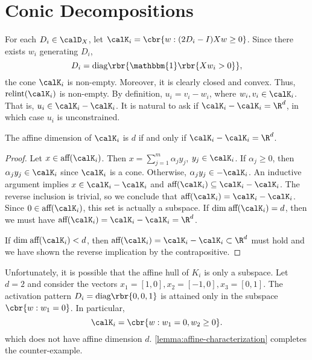 \documentclass{article}
\begin{document}
\section{Conic Decompositions}

For each \( D_i \in \calD_X \), let \( \calK_i = \cbr{w : (2D_i - I) X w \geq 0} \).
Since there exists \( w_i \) generating \( D_i \),
\[
	D_i = \text{diag}\rbr{\mathbbm{1}\rbr{X w_i > 0}},
\]
the cone \( \calK_i \) is non-empty.
Moreover, it is clearly closed and convex.
Thus, \( \text{relint} (\calK_i) \) is non-empty.
By definition, \( u_i = v_i - w_i \), where \( w_i, v_i \in \calK_i \).
That is, \( u_i \in \calK_i - \calK_i \).
It is natural to ask if \( \calK_i - \calK_i = \R^d \), in which case \( u_i \) is unconstrained.

\begin{lemma}\label{lemma:affine-characterization}
	The affine dimension of \( \calK_i \) is \( d \) if and only if \( \calK_i - \calK_i = \R^d \).
\end{lemma}
\begin{proof}
	Let \( x \in \text{aff} (\calK_i) \).
	Then \( x = \sum_{j=1}^m \alpha_j y_j \), \( y_j \in \calK_i \).
	If \( \alpha_j \geq 0 \), then \( \alpha_j y_j \in \calK_i \) since \( \calK_i \) is a cone.
	Otherwise, \( \alpha_j y_j \in - \calK_i \).
	An inductive argument implies \( x \in \calK_i - \calK_i \) and \( \text{aff} (\calK_i) \subseteq \calK_i - \calK_i \).
	The reverse inclusion is trivial, so we conclude that \( \text{aff} (\calK_i) = \calK_i - \calK_i \).
	Since \( 0 \in \text{aff} (\calK_i) \), this set is actually a subspace.
	If \( \text{dim} \; \text{aff} (\calK_i) = d \), then we must have \( \text{aff} (\calK_i) = \calK_i - \calK_i = \R^d \).

	If \( \text{dim} \; \text{aff} (\calK_i) < d \), then \( \text{aff} (\calK_i) = \calK_i - \calK_i \subset \R^d \) must hold and we have shown the reverse implication by the contrapositive.
\end{proof}

Unfortunately, it is possible that the affine hull of \( K_i \) is only a subspace.
Let \( d = 2 \) and consider the vectors \( x_1 = [1, 0], x_2 = [-1, 0], x_3 = [0, 1] \).
The activation pattern \( D_i = \text{diag}\rbr{0, 0, 1} \) is attained only in the subspace \( \cbr{ w : w_1 = 0 } \).
In particular,
\[
	\calK_i = \cbr{w : w_1 = 0, w_2 \geq 0}.
\]
which does not have affine dimension \( d \).
\autoref{lemma:affine-characterization} completes the counter-example.
\end{document}
